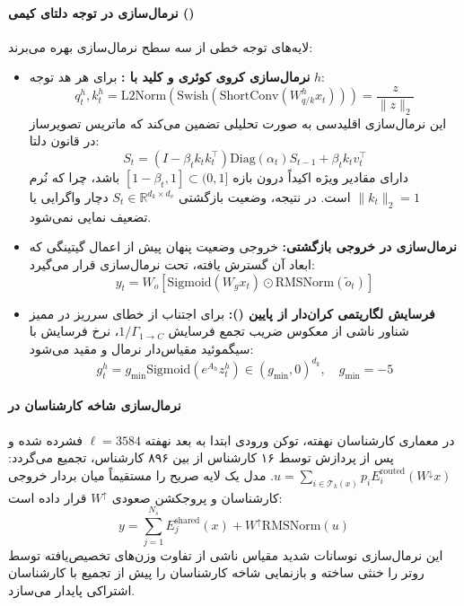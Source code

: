 \paragraph*{نرمال‌سازی در توجه دلتای کیمی ()}
لایه‌های توجه خطی  از سه سطح نرمال‌سازی بهره می‌برند:
\begin{itemize}
    \item \textbf{نرمال‌سازی کروی کوئری و کلید با :}
    برای هر هد توجه $h$:
    \begin{equation}
        q_t^h, k_t^h = \text{L2Norm}\left( \text{Swish}(\text{ShortConv}(W_{q/k}^h x_t)) \right) = \frac{z}{\|z\|_2}
    \end{equation}
    این نرمال‌سازی اقلیدسی به صورت تحلیلی تضمین می‌کند که ماتریس تصویرساز در قانون دلتا:
    \begin{equation}
        S_t = (I - \beta_t k_t k_t^\top) \text{Diag}(\alpha_t) S_{t-1} + \beta_t k_t v_t^\top
    \end{equation}
    دارای مقادیر ویژه اکیداً درون بازه $[1-\beta_t, 1] \subset (0, 1]$ باشد، چرا که نُرم $\|k_t\|_2 = 1$ است. در نتیجه، وضعیت بازگشتی $S_t \in \mathbb{R}^{d_k \times d_v}$ دچار واگرایی یا تضعیف نمایی نمی‌شود.
    \item \textbf{نرمال‌سازی  در خروجی بازگشتی:}
    خروجی وضعیت پنهان پیش از اعمال گیتینگی که ابعاد آن گسترش یافته، تحت نرمال‌سازی قرار می‌گیرد:
    \begin{equation}
        y_t = W_o \left[ \text{Sigmoid}(W_g x_t) \odot \text{RMSNorm}(\tilde{o}_t) \right]
    \end{equation}
    \item \textbf{فرسایش لگاریتمی کران‌دار از پایین ():}
    برای اجتناب از خطای سرریز در ممیز شناور  ناشی از معکوس ضریب تجمع فرسایش $1/\Gamma_{1 \to C}$، نرخ فرسایش با سیگموئید مقیاس‌دار نرمال و مقید می‌شود:
    \begin{equation}
        g_t^h = g_{\min} \text{Sigmoid}(e^{A_h} z_t^h) \in (g_{\min}, 0)^{d_k}, \quad g_{\min} = -5
    \end{equation}
\end{itemize}

\paragraph*{نرمال‌سازی شاخه کارشناسان در }
در معماری کارشناسان نهفته، توکن ورودی ابتدا به بعد نهفته $\ell = 3584$ فشرده شده و پس از پردازش توسط ۱۶ کارشناس از بین ۸۹۶ کارشناس، تجمیع می‌گردد: $u = \sum_{i \in \mathcal{T}_k(x)} p_i E_i^{\text{routed}}(W^\downarrow x)$.
مدل  یک لایه  صریح را مستقیماً میان بردار خروجی کارشناسان و پروجکشن صعودی $W^\uparrow$ قرار داده است:
\begin{equation}
    y = \sum_{j=1}^{N_s} E_j^{\text{shared}}(x) + W^\uparrow \text{RMSNorm}(u)
\end{equation}
این نرمال‌سازی نوسانات شدید مقیاس ناشی از تفاوت وزن‌های تخصیص‌یافته توسط روتر را خنثی ساخته و بازنمایی شاخه کارشناسان را پیش از تجمیع با کارشناسان اشتراکی پایدار می‌سازد.

